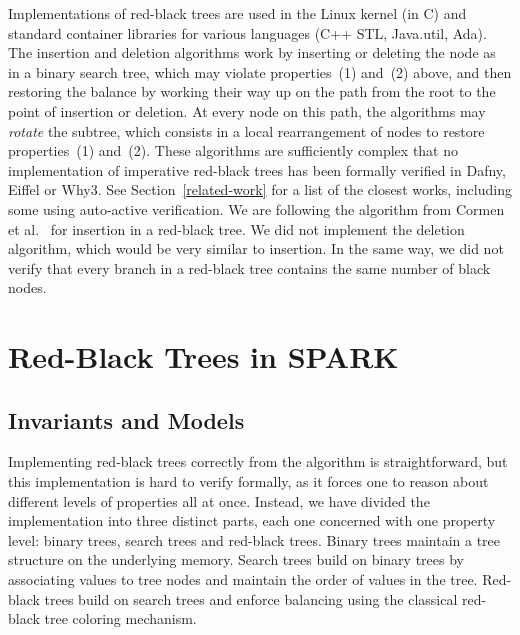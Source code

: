 \documentclass{llncs}
\newcommand{\spark}{SPARK\xspace}
\begin{document}
Implementations of red-black trees are used in the Linux kernel (in C) and
standard container libraries for various languages (C++ STL, Java.util,
Ada). The insertion and deletion algorithms work by inserting or deleting the
node as in a binary search tree, which may violate properties~(1) and~(2)
above, and then restoring the balance by working their way up on the path from
the root to the point of insertion or deletion. At every node on this path, the
algorithms may \emph{rotate} the subtree, which consists in a local
rearrangement of nodes to restore properties~(1) and~(2). These algorithms are
sufficiently complex that no implementation of imperative red-black trees has
been formally verified in Dafny, Eiffel or Why3. See
Section~\ref{related-work} for a list of the closest works, including some
using auto-active verification. We are following the algorithm from Cormen et
al.~\cite{Cormen2009} for insertion in a red-black tree. We did not implement
the deletion algorithm, which would be very similar to insertion. In the same
way, we did not verify that every branch in a red-black tree contains the same
number of black nodes.

\section{Red-Black Trees in \spark}
\subsection{Invariants and Models}
\label{sec-rbt-inv}


Implementing red-black trees correctly from the algorithm is straightforward,
but this implementation is hard to verify formally, as it forces one to
reason about different levels of properties all at once. Instead, we have
divided the implementation into three distinct parts, each one concerned with
one property level: binary trees, search trees and red-black trees. Binary
trees maintain a tree structure on the underlying memory. Search trees build on
binary trees by associating values to tree nodes and maintain the order of
values in the tree. Red-black trees build on search trees and enforce balancing
using the classical red-black tree coloring mechanism.
\end{document}
